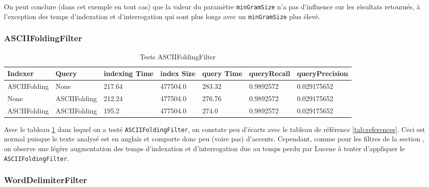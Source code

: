 On peut conclure (dans cet exemple en tout cas) que la valeur du paramètre \texttt{minGramSize} n’a pas d'influence sur les résultats retournés, à l’exception des temps d’indexation et d’interrogation qui sont plus longs avec un \texttt{minGramSize} plus élevé.

\subsubsection{ASCIIFoldingFilter}

\begin{table}[!htbp]
    \hspace{-2cm}
                \begin{tabular}{|p{2cm}|p{2cm}|p{2cm}|p{2cm}|p{2.5cm}|p{2.5cm}|p{2.5cm}|}
                    \hline
                    \textbf{Indexer} & \textbf{Query} & \textbf{indexing Time} & \textbf{index Size} & \textbf{query Time} & \textbf{queryRecall} & \textbf{queryPrecision}\\
                    \hline
ASCIIFolding & None & 217.64 & 477504.0 & 283.32 & 0.9892572 & 0.029175652\\
		\hline
None & ASCIIFolding & 212.24 & 477504.0 & 276.76 & 0.9892572 & 0.029175652\\
		\hline
ASCIIFolding & ASCIIFolding & 195.2 & 477504.0 & 274.0 & 0.9892572 & 0.029175652\\
                    \hline
                \end{tabular}
                \caption{Tests ASCIIFoldingFilter}
                \label{tab:tests_ASCIIFoldingFilter}
            \end{table}

Avec le tableau \ref{tab:tests_ASCIIFoldingFilter} dans lequel on a testé \texttt{ASCIIFoldingFilter}, on constate peu d’écarts avec le tableau de référence \ref{tab:references}. Ceci est normal puisque le texte analysé est en anglais et comporte donc peu (voire pas) d’accents. Cependant, comme pour les filtres de la section \label{section:filtrespourris}, on observe une légère augmentation des temps d’indexation et d’interrogation due au temps perdu par Lucene à tenter d’appliquer le \texttt{ASCIIFoldingFilter}.

\subsubsection{WordDelimiterFilter}

